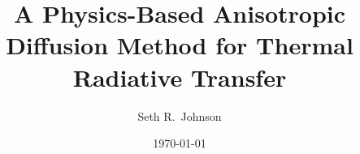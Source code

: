 \author{Seth R.~Johnson}
\title{A Physics-Based Anisotropic Diffusion Method for Thermal Radiative
Transfer}
\date{\today}

\usepackage{color}

\newcommand{\chapter}[1]{%
\par\vspace{2ex}%
\noindent%
\hspace{\stretch{1}}%
\colorbox{intertextbg}{\parbox{0.75\columnwidth}{Chapter from Seth's
dissertation: \emph{#1}}}%
\hspace{\stretch{1}}%
\vspace{2ex}\par%
}

\newcommand{\prelistpar}{}
